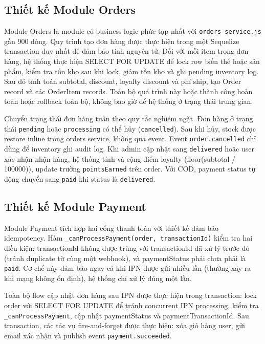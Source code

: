 \subsection{Thiết kế Module Orders}

Module Orders là module có business logic phức tạp nhất với \texttt{orders-service.js} gần 900 dòng. Quy trình tạo đơn hàng được thực hiện trong một Sequelize transaction duy nhất để đảm bảo tính nguyên tử. Đối với mỗi item trong đơn hàng, hệ thống thực hiện SELECT FOR UPDATE để lock row biến thể hoặc sản phẩm, kiểm tra tồn kho sau khi lock, giảm tồn kho và ghi pending inventory log. Sau đó tính toán subtotal, discount, loyalty discount và phí ship, tạo Order record và các OrderItem records. Toàn bộ quá trình này hoặc thành công hoàn toàn hoặc rollback toàn bộ, không bao giờ để hệ thống ở trạng thái trung gian.

Chuyển trạng thái đơn hàng tuân theo quy tắc nghiêm ngặt. Đơn hàng ở trạng thái \texttt{pending} hoặc \texttt{processing} có thể hủy (\texttt{cancelled}). Sau khi hủy, stock được restore inline trong orders service, không qua event. Event \texttt{order.cancelled} chỉ dùng để inventory ghi audit log. Khi admin cập nhật sang \texttt{delivered} hoặc user xác nhận nhận hàng, hệ thống tính và cộng điểm loyalty (floor(subtotal / 100000)), update trường \texttt{pointsEarned} trên order. Với COD, payment status tự động chuyển sang \texttt{paid} khi status là \texttt{delivered}.

\subsection{Thiết kế Module Payment}

Module Payment tích hợp hai cổng thanh toán với thiết kế đảm bảo idempotency. Hàm \texttt{\_canProcessPayment(order, transactionId)} kiểm tra hai điều kiện: transactionId không được trùng với transactionId đã xử lý trước đó (tránh duplicate từ cùng một webhook), và paymentStatus phải chưa phải là \texttt{paid}. Cơ chế này đảm bảo ngay cả khi IPN được gửi nhiều lần (thường xảy ra khi mạng không ổn định), hệ thống chỉ xử lý đúng một lần.

Toàn bộ flow cập nhật đơn hàng sau IPN được thực hiện trong transaction: lock order với SELECT FOR UPDATE để tránh concurrent IPN processing, kiểm tra \texttt{\_canProcessPayment}, cập nhật paymentStatus và paymentTransactionId. Sau transaction, các tác vụ fire-and-forget được thực hiện: xóa giỏ hàng user, gửi email xác nhận và publish event \texttt{payment.succeeded}.

